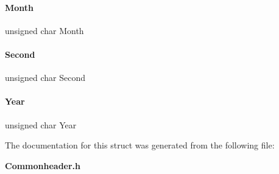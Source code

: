 \mbox{\label{a00068_a47fbf139f673da3a34bfbd9714895f8f}} 
\paragraph{Month}
{\footnotesize\ttfamily unsigned char Month}

\mbox{\label{a00068_a0ea5e4d98a89caeb4b146f186b0c2fac}} 
\paragraph{Second}
{\footnotesize\ttfamily unsigned char Second}

\mbox{\label{a00068_a13ea342955a46451bcc9fc65505a7c97}} 
\paragraph{Year}
{\footnotesize\ttfamily unsigned char Year}



The documentation for this struct was generated from the following file\+:\begin{DoxyCompactItemize}
\item 
\textbf{ Commonheader.\+h}\end{DoxyCompactItemize}
